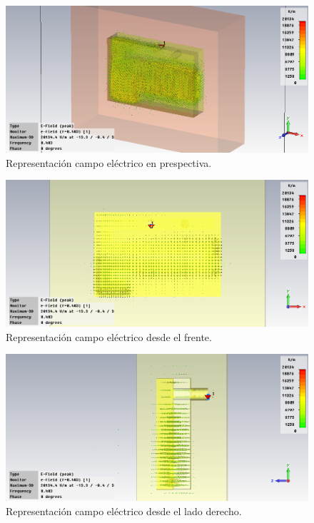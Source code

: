 \begin{figure}[!htb]
    \centering
    \includegraphics[scale=0.4]{./Simulaciones/tunned_antenna_muscle/tunned_serpentine_muscle_E-Field}
    \caption{Representación campo eléctrico en prespectiva.}
    \label{fig:fig5.25}
\end{figure}

\begin{figure}[!htb]
    \centering
    \includegraphics[scale=0.4]{./Simulaciones/tunned_antenna_muscle/tunned_serpentine_muscle_E-Field_2}
    \caption{Representación campo eléctrico desde el frente.}
    \label{fig:fig5.26}
\end{figure}

\begin{figure}[!htb]
    \centering
    \includegraphics[scale=0.4]{./Simulaciones/tunned_antenna_muscle/tunned_serpentine_muscle_E-Field_3}
    \caption{Representación campo eléctrico desde el lado derecho.}
    \label{fig:fig5.27}
\end{figure}

